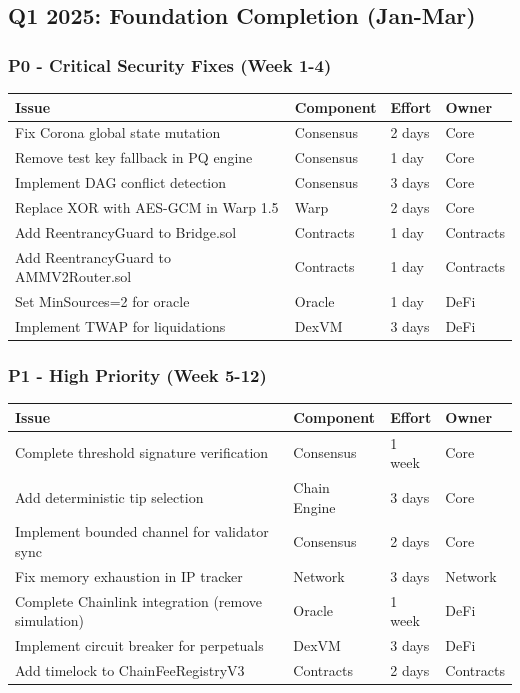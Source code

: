 \documentclass[
]{article}
\newcounter{none} %
\begin{document}
\subsection{Q1 2025: Foundation Completion
(Jan-Mar)}\label{q1-2025-foundation-completion-jan-mar}

\subsubsection{P0 - Critical Security Fixes (Week
1-4)}\label{p0---critical-security-fixes-week-1-4}

{\def\LTcaptype{none} %
\begin{longtable}[]{@{}llll@{}}
\toprule\noalign{}
Issue & Component & Effort & Owner \\
\midrule\noalign{}
\endhead
\bottomrule\noalign{}
\endlastfoot
Fix Corona global state mutation & Consensus & 2 days & Core \\
Remove test key fallback in PQ engine & Consensus & 1 day & Core \\
Implement DAG conflict detection & Consensus & 3 days & Core \\
Replace XOR with AES-GCM in Warp 1.5 & Warp & 2 days & Core \\
Add ReentrancyGuard to Bridge.sol & Contracts & 1 day & Contracts \\
Add ReentrancyGuard to AMMV2Router.sol & Contracts & 1 day &
Contracts \\
Set MinSources=2 for oracle & Oracle & 1 day & DeFi \\
Implement TWAP for liquidations & DexVM & 3 days & DeFi \\
\end{longtable}
}

\subsubsection{P1 - High Priority (Week
5-12)}\label{p1---high-priority-week-5-12}

{\def\LTcaptype{none} %
\begin{longtable}[]{@{}llll@{}}
\toprule\noalign{}
Issue & Component & Effort & Owner \\
\midrule\noalign{}
\endhead
\bottomrule\noalign{}
\endlastfoot
Complete threshold signature verification & Consensus & 1 week & Core \\
Add deterministic tip selection & Chain Engine & 3 days & Core \\
Implement bounded channel for validator sync & Consensus & 2 days &
Core \\
Fix memory exhaustion in IP tracker & Network & 3 days & Network \\
Complete Chainlink integration (remove simulation) & Oracle & 1 week &
DeFi \\
Implement circuit breaker for perpetuals & DexVM & 3 days & DeFi \\
Add timelock to ChainFeeRegistryV3 & Contracts & 2 days & Contracts \\
\end{longtable}
}
\end{document}
